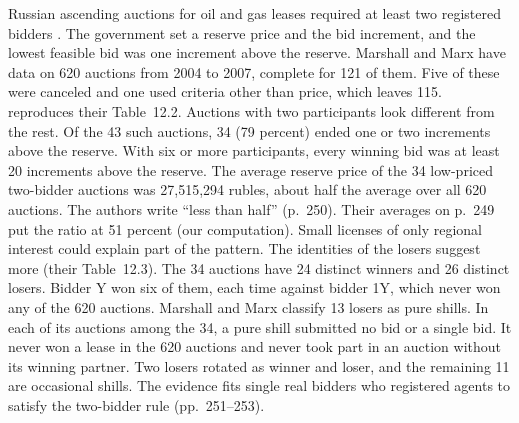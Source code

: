 \begin{example}\label{ex:13-russia}
Russian ascending auctions for oil and gas leases required at least two registered bidders
\citep[pp.~248--255]{MarshallMarx2012}. The government set a reserve price and the bid increment, and the lowest
feasible bid was one increment above the reserve. Marshall and Marx have data on 620 auctions from 2004 to 2007,
complete for 121 of them. Five of these were canceled and one used criteria other than price, which leaves 115.
 reproduces their Table~12.2. Auctions with two participants look different from the rest.
Of the 43 such auctions, 34 (79 percent) ended one or two increments above the reserve. With six or more
participants, every winning bid was at least 20 increments above the reserve. The average reserve price of the 34
low-priced two-bidder auctions was 27,515,294 rubles, about half the average over all 620 auctions. The authors
write ``less than half'' (p.~250). Their averages on p.~249 put the ratio at 51 percent (our computation).
Small
licenses of only regional interest could explain part of the pattern. The identities of the losers suggest more
(their Table~12.3). The 34 auctions have 24 distinct winners and 26 distinct losers. Bidder Y won six of them, each
time against bidder 1Y, which never won any of the 620 auctions. Marshall and Marx classify 13 losers as pure
shills. In each of its auctions among the 34, a pure shill submitted no bid or a single bid. It never won a lease in
the 620 auctions and never took part in an auction without its winning partner.
Two losers rotated as winner and loser, and the remaining 11 are occasional shills. The evidence fits single real
bidders who registered agents to satisfy the two-bidder rule (pp.~251--253).
\end{example}

